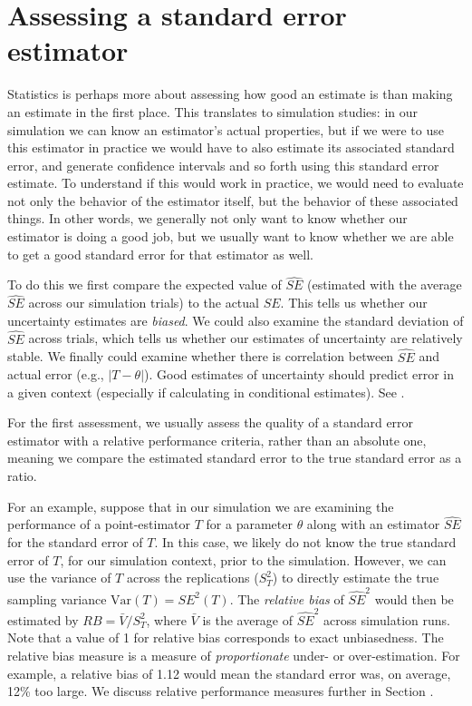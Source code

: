 \documentclass[
]{book}
\begin{document}
\hypertarget{assessing-a-standard-error-estimator}{%
\section{Assessing a standard error estimator}\label{assessing-a-standard-error-estimator}}

Statistics is perhaps more about assessing how good an estimate is than making an estimate in the first place.
This translates to simulation studies: in our simulation we can know an estimator's actual properties, but if we were to use this estimator in practice we would have to also estimate its associated standard error, and generate confidence intervals and so forth using this standard error estimate.
To understand if this would work in practice, we would need to evaluate not only the behavior of the estimator itself, but the behavior of these associated things.
In other words, we generally not only want to know whether our estimator is doing a good job, but we usually want to know whether we are able to get a good standard error for that estimator as well.

To do this we first compare the expected value of \(\widehat{SE}\) (estimated with the average \(\widehat{SE}\) across our simulation trials) to the actual \(SE\).
This tells us whether our uncertainty estimates are \emph{biased}.
We could also examine the standard deviation of \(\widehat{SE}\) across trials, which tells us whether our estimates of uncertainty are relatively stable.
We finally could examine whether there is correlation between \(\widehat{SE}\) and actual error (e.g., \(\left|T - \theta \right|\)).
Good estimates of uncertainty should predict error in a given context (especially if calculating in conditional estimates).
See \citet{sundberg2003conditional}.

For the first assessment, we usually assess the quality of a standard error estimator with a relative performance criteria, rather than an absolute one, meaning we compare the estimated standard error to the true standard error as a ratio.

For an example, suppose that in our simulation we are examining the performance of a point-estimator \(T\) for a parameter \(\theta\) along with an estimator \(\widehat{SE}\) for the standard error of \(T\).
In this case, we likely do not know the true standard error of \(T\), for our simulation context, prior to the simulation.
However, we can use the variance of \(T\) across the replications (\(S_T^2\)) to directly estimate the true sampling variance \(\text{Var}(T) = SE^2(T)\).
The \emph{relative bias} of \(\widehat{SE}^2\) would then be estimated by \(RB = \bar{V} / S_T^2\), where \(\bar{V}\) is the average of \(\widehat{SE}^2\) across simulation runs.
Note that a value of 1 for relative bias corresponds to exact unbiasedness.
The relative bias measure is a measure of \emph{proportionate} under- or over-estimation.
For example, a relative bias of 1.12 would mean the standard error was, on average, 12\% too large.
We discuss relative performance measures further in Section \citet{sec_relative_performance}.
\end{document}
